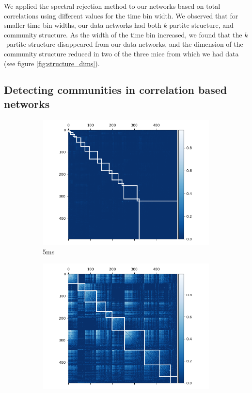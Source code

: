   We applied the spectral rejection method to our networks based on total correlations using different values for the time bin width. We observed that for smaller time bin widths, our data networks had both $k$-partite structure, and community structure. As the width of the time bin increased, we found that the $k$-partite structure disappeared from our data networks, and the dimension of the community structure reduced in two of the three mice from which we had data (see figure \ref{fig:structure_dims}).

  \subsection{Detecting communities in correlation based networks}

  \begin{figure}[p]
    \begin{subfigure}[h]{0.5\linewidth}
      \includegraphics[width=\linewidth]{figures/eight_probe/Krebs_0p005_rectified_cons_cluster_map.png}
      \caption{5ms}
      \label{fig:consensus_cluster_5ms}
    \end{subfigure}
    \begin{subfigure}[h]{0.5\linewidth}
      \includegraphics[width=\linewidth]{figures/eight_probe/Krebs_1p0_rectified_cons_cluster_map.png}

\end{subfigure}
\end{figure}
